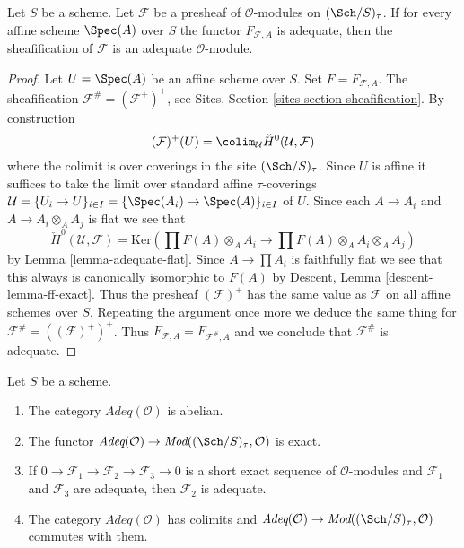 \begin{lemma}
\label{lemma-sheafification-adequate}
Let $S$ be a scheme. Let $\mathcal{F}$ be a presheaf of $\mathcal{O}$-modules
on $(\Sch/S)_\tau$. If for every affine scheme
$\Spec(A)$ over $S$ the functor $F_{\mathcal{F}, A}$ is
adequate, then the sheafification of $\mathcal{F}$ is an adequate
$\mathcal{O}$-module.
\end{lemma}

\begin{proof}
Let $U = \Spec(A)$ be an affine scheme over $S$.
Set $F = F_{\mathcal{F}, A}$.
The sheafification $\mathcal{F}^\# = (\mathcal{F}^+)^+$, see
Sites, Section \ref{sites-section-sheafification}.
By construction
$$
(\mathcal{F})^+(U) =
\colim_\mathcal{U} \check{H}^0(\mathcal{U}, \mathcal{F})
$$
where the colimit is over coverings in the site $(\Sch/S)_\tau$.
Since $U$ is affine it suffices to take the limit over standard
affine $\tau$-coverings
$\mathcal{U} = \{U_i \to U\}_{i \in I} =
\{\Spec(A_i) \to \Spec(A)\}_{i \in I}$ of $U$.
Since each $A \to A_i$ and $A \to A_i \otimes_A A_j$ is flat we see that
$$
\check{H}^0(\mathcal{U}, \mathcal{F}) =
\text{Ker}(\prod F(A) \otimes_A A_i \to \prod F(A) \otimes_A A_i \otimes_A A_j)
$$
by
Lemma \ref{lemma-adequate-flat}.
Since $A \to \prod A_i$ is faithfully flat we see that this always
is canonically isomorphic to $F(A)$ by
Descent, Lemma \ref{descent-lemma-ff-exact}.
Thus the presheaf $(\mathcal{F})^+$ has the same value as
$\mathcal{F}$ on all affine schemes over $S$. Repeating the argument
once more we deduce the same thing for $\mathcal{F}^\# = ((\mathcal{F})^+)^+$.
Thus $F_{\mathcal{F}, A} = F_{\mathcal{F}^\#, A}$ and we conclude
that $\mathcal{F}^\#$ is adequate.
\end{proof}

\begin{lemma}
\label{lemma-abelian-adequate}
Let $S$ be a scheme.
\begin{enumerate}
\item The category $\textit{Adeq}(\mathcal{O})$ is abelian.
\item The functor
$\textit{Adeq}(\mathcal{O}) \to
\textit{Mod}((\Sch/S)_\tau, \mathcal{O})$
is exact.
\item If $0 \to \mathcal{F}_1 \to \mathcal{F}_2 \to \mathcal{F}_3 \to 0$
is a short exact sequence of $\mathcal{O}$-modules and
$\mathcal{F}_1$ and $\mathcal{F}_3$ are adequate, then
$\mathcal{F}_2$ is adequate.
\item The category $\textit{Adeq}(\mathcal{O})$ has colimits and
$\textit{Adeq}(\mathcal{O}) \to
\textit{Mod}((\Sch/S)_\tau, \mathcal{O})$
commutes with them.
\end{enumerate}
\end{lemma}

